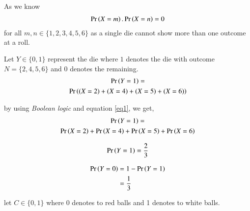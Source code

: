 \documentclass[journal,12pt,twocolumn]{IEEEtran}
\begin{document}
\vspace{0.2in}

As we know
\begin{align}\label{eq1}
    \Pr\left(X=m\right).\Pr\left(X=n\right)=0
\end{align}
for all $m,n \in \{1,2,3,4,5,6\}$ as a single die cannot show more than one outcome at a roll.
\vspace{0.2in}

Let $Y \in \{0, 1\}$ represent the die where $1$ denotes the die with outcome $N = \{2,4,5,6\}$ and $0$ denotes the remaining.
\begin{multline}
    \Pr\left(Y=1\right)=\\
    \Pr\left((X=2)+(X=4)+(X=5)+(X=6)\right)
\end{multline}

by using \textit{Boolean logic} and equation \eqref{eq1}, we get,
\begin{multline}
    \Pr\left(Y=1\right)=\\
    \Pr\left(X=2\right)+\Pr\left(X=4\right)+\Pr\left(X=5\right)+\Pr\left(X=6\right)
\end{multline}

\begin{align}\label{eq2}
    \Pr\left(Y=1\right)=\frac{2}{3}
\end{align}

\begin{align}\label{eq3}
    \begin{split}
        \Pr\left(Y=0\right)&=1-\Pr\left(Y=1\right)\\
        &=\frac{1}{3}
    \end{split}
\end{align}

let $C \in \{0,1\}$ where 0 denotes to red balls and 1 denotes to white balls.

\begin{table}[h!]
\centering
\caption{Table of number of balls}
\end{table}


\begin{table}[h!]
\centering
\caption{Table of probability of taking balls from each bag}
\end{table}
\end{document}
